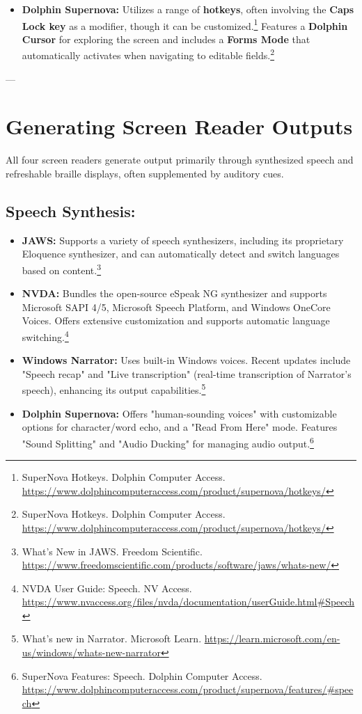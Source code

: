 \begin{itemize}[leftmargin=*,noitemsep,topsep=0pt]
    \item \textbf{Dolphin Supernova:} Utilizes a range of \textbf{hotkeys}, often involving the \textbf{Caps Lock key} as a modifier, though it can be customized.\footnote{SuperNova Hotkeys. Dolphin Computer Access. \url{https://www.dolphincomputeraccess.com/product/supernova/hotkeys/}} Features a \textbf{Dolphin Cursor} for exploring the screen and includes a \textbf{Forms Mode} that automatically activates when navigating to editable fields.\footnote{SuperNova Hotkeys. Dolphin Computer Access. \url{https://www.dolphincomputeraccess.com/product/supernova/hotkeys/}}
\end{itemize}

---

\section{Generating Screen Reader Outputs}
\label{sec:generating-outputs}

All four screen readers generate output primarily through synthesized speech and refreshable braille displays, often supplemented by auditory cues.

\subsection*{Speech Synthesis:}
\begin{itemize}[leftmargin=*,noitemsep,topsep=0pt]
    \item \textbf{JAWS:} Supports a variety of speech synthesizers, including its proprietary Eloquence synthesizer, and can automatically detect and switch languages based on content.\footnote{What's New in JAWS. Freedom Scientific. \url{https://www.freedomscientific.com/products/software/jaws/whats-new/}}
    \item \textbf{NVDA:} Bundles the open-source eSpeak NG synthesizer and supports Microsoft SAPI 4/5, Microsoft Speech Platform, and Windows OneCore Voices. Offers extensive customization and supports automatic language switching.\footnote{NVDA User Guide: Speech. NV Access. \url{https://www.nvaccess.org/files/nvda/documentation/userGuide.html#Speech}}
    \item \textbf{Windows Narrator:} Uses built-in Windows voices. Recent updates include "Speech recap" and "Live transcription" (real-time transcription of Narrator's speech), enhancing its output capabilities.\footnote{What's new in Narrator. Microsoft Learn. \url{https://learn.microsoft.com/en-us/windows/whats-new-narrator}}
    \item \textbf{Dolphin Supernova:} Offers "human-sounding voices" with customizable options for character/word echo, and a "Read From Here" mode. Features "Sound Splitting" and "Audio Ducking" for managing audio output.\footnote{SuperNova Features: Speech. Dolphin Computer Access. \url{https://www.dolphincomputeraccess.com/product/supernova/features/#speech}}
\end{itemize}

